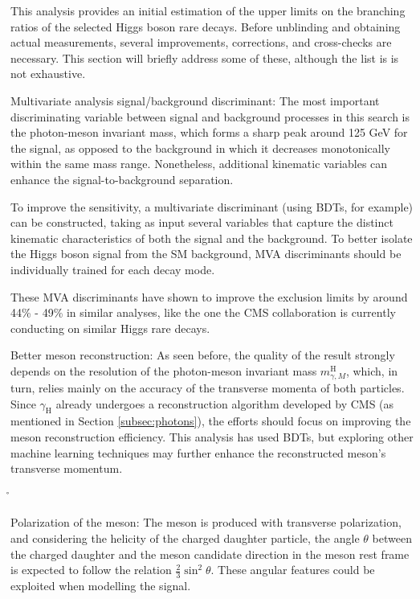 This analysis provides an initial estimation of the upper limits on the branching ratios of the selected Higgs boson rare decays. Before unblinding and obtaining actual measurements, several improvements, corrections, and cross-checks are necessary. This section will briefly address some of these, although the list is is not exhaustive.
\vspace*{-6pt}
\begin{myitemlist}
    \item[Multivariate analysis signal/background discriminant:] The most important discriminating variable between signal and background processes in this search is the photon-meson invariant mass, which forms a sharp peak around 125 GeV for the signal, as opposed to the background in which it decreases monotonically within the same mass range. Nonetheless, additional kinematic variables can enhance the signal-to-background separation.
    
    To improve the sensitivity, a multivariate discriminant (using BDTs, for example) can be constructed, taking as input several variables that capture the distinct kinematic characteristics of both the signal and the background. To better isolate the Higgs boson signal from the SM background, MVA discriminants should be individually trained for each decay mode.

    These MVA discriminants have shown to improve the exclusion limits by around 44\% - 49\% in similar analyses, like the one the CMS collaboration is currently conducting on similar Higgs rare decays.

    \item[Better meson reconstruction:] As seen before, the quality of the result strongly depends on the resolution of the photon-meson invariant mass $m^{\text{H}}_{\gamma, M}$, which, in turn, relies mainly on the accuracy of the transverse momenta of both particles. Since $\gamma_{\text{H}}$ already undergoes a reconstruction algorithm developed by CMS (as mentioned in Section \ref{subsec:photons}), the efforts should focus on improving the meson reconstruction efficiency. This analysis has used BDTs, but exploring other machine learning techniques may further enhance the reconstructed meson's transverse momentum.

    {\r\item[Polarization of the meson:] The meson is produced with transverse polarization, and considering the helicity of the charged daughter particle, the angle $\theta$ between the charged daughter and the meson candidate direction in the meson rest frame is expected to follow the relation $\frac{2}{3}\sin^{2}{\theta}$. These angular features could be exploited when modelling the signal. }
    

\end{myitemlist}
